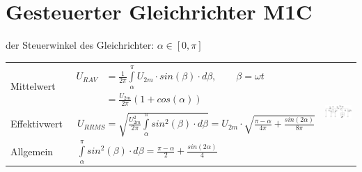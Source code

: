 \section{Gesteuerter Gleichrichter M1C}
der Steuerwinkel des Gleichrichter: $\alpha \in [0, \pi]$

\begin{tabular}{|l|l|p{}}
	\cline{1-2}
  Mittelwert 
  	& $\begin{aligned}
  		U_{R AV} &= \frac{1}{2\pi}\int\limits_{\alpha}^{\pi}U_{2m} \cdot sin(\beta) \cdot d\beta, \qquad \beta = \omega t\\
  				&= \frac{U_{2m}}{2\pi}(1 + cos(\alpha))
  		\end{aligned}$
  		& \multirow{3}{*}{\includegraphics[width = \linewidth]{./pictures/m1c.png}}\\[8mm]
  	\cline{1-2}
  Effektivwert 
  	&\ $U_{R RMS} = \sqrt{\frac{U_{2m}^2}{2\pi}\int\limits_{\alpha}^{\pi}sin^2(\beta) \cdot d\beta} = U_{2m} \cdot \sqrt{\frac{\pi-\alpha}{4\pi}+\frac{sin(2\alpha)}{8\pi}}$ &\\
  	\cline{1-2}
  Allgemein
  	&\ $\int\limits_{\alpha}^{\pi}sin^2(\beta) \cdot d\beta = \frac{\pi-\alpha}{2}+\frac{sin(2\alpha)}{4}$&\\
  	\cline{1-2}
\end{tabular}